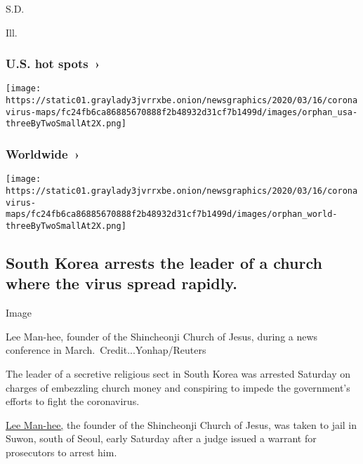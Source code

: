 S.D.

\href{https://www.nytimes3xbfgragh.onion/interactive/2020/us/illinois-coronavirus-cases.html}{}

Ill.

\href{https://www.nytimes3xbfgragh.onion/interactive/2020/us/coronavirus-us-cases.html}{}

\hypertarget{us-hot-spots-}{%
\subsubsection{U.S. hot spots~›}\label{us-hot-spots-}}

\texttt{[image: https://static01.graylady3jvrrxbe.onion/newsgraphics/2020/03/16/coronavirus-maps/fc24fb6ca86885670888f2b48932d31cf7b1499d/images/orphan\_usa-threeByTwoSmallAt2X.png]}

\href{https://www.nytimes3xbfgragh.onion/interactive/2020/world/coronavirus-maps.html}{}

\hypertarget{worldwide-}{%
\subsubsection{Worldwide~›}\label{worldwide-}}

\texttt{[image: https://static01.graylady3jvrrxbe.onion/newsgraphics/2020/03/16/coronavirus-maps/fc24fb6ca86885670888f2b48932d31cf7b1499d/images/orphan\_world-threeByTwoSmallAt2X.png]}

\hypertarget{south-korea-arrests-the-leader-of-a-church-where-the-virus-spread-rapidly}{%
\subsection{South Korea arrests the leader of a church where the virus
spread
rapidly.}\label{south-korea-arrests-the-leader-of-a-church-where-the-virus-spread-rapidly}}

Image

Lee Man-hee, founder of the Shincheonji Church of Jesus, during a news
conference in March.~Credit...Yonhap/Reuters

The leader of a secretive religious sect in South Korea was arrested
Saturday on charges of embezzling church money and conspiring to impede
the government's efforts to fight the coronavirus.

\href{https://www.nytimes3xbfgragh.onion/2020/03/02/world/asia/coronavirus-south-korea-shincheonji.html?searchResultPosition=1}{Lee
Man-hee,} the founder of the Shincheonji Church of Jesus, was taken to
jail in Suwon, south of Seoul, early Saturday after a judge issued a
warrant for prosecutors to arrest him.

